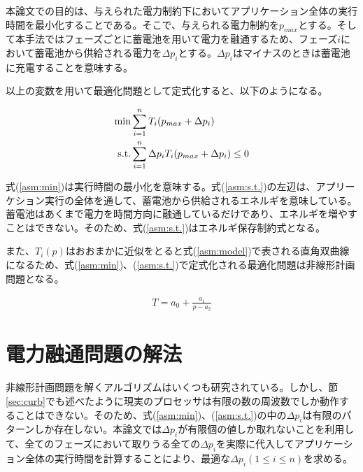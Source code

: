 本論文での目的は、与えられた電力制約下においてアプリケーション全体の実行時間を最小化することである。そこで、与えられる電力制約を$p_{max}$とする。そして本手法ではフェーズごとに蓄電池を用いて電力を融通するため、フェーズ$i$において蓄電池から供給される電力を$\Delta p_i$とする。$\Delta p_i$はマイナスのときは蓄電池に充電することを意味する。

以上の変数を用いて最適化問題として定式化すると、以下のようになる。

\begin{eqnarray}
{\rm min } & \sum_{i=1}^n T_i(p_{max} + \Delta p_i) \label{asm:min} \\
{\rm s.t. } & \sum_{i=1}^n \Delta p_i T_i(p_{max} + \Delta p_i) \leq 0 \label{asm:s.t.}
\end{eqnarray}

式(\ref{asm:min})は実行時間の最小化を意味する。式(\ref{asm:s.t.})の左辺は、アプリーケション実行の全体を通して、蓄電池から供給されるエネルギを意味している。蓄電池はあくまで電力を時間方向に融通しているだけであり、エネルギを増やすことはできない。そのため、式(\ref{asm:s.t.})はエネルギ保存制約式となる。

また、$T_i(p)$はおおまかに近似をとると式(\ref{asm:model})で表される直角双曲線になるため、式(\ref{asm:min})、(\ref{asm:s.t.})で定式化される最適化問題は非線形計画問題となる。

\begin{eqnarray}
T = a_0 + \frac{a_1}{p-a_2} \label{asm:model}
\end{eqnarray}


\section{電力融通問題の解法}
\label{sec:algorithm}

非線形計画問題を解くアルゴリズムはいくつも研究されている。しかし、節\ref{sec:curb}でも述べたように現実のプロセッサは有限の数の周波数でしか動作することはできない。そのため、式(\ref{asm:min})、(\ref{asm:s.t.})の中の$\Delta p_i$は有限のパターンしか存在しない。本論文では$\Delta p_i$が有限個の値しか取れないことを利用して、全てのフェーズにおいて取りうる全ての$\Delta p_i$を実際に代入してアプリケーション全体の実行時間を計算することにより、最適な$\Delta p_i(1 \leq i \leq n)$を求める。






